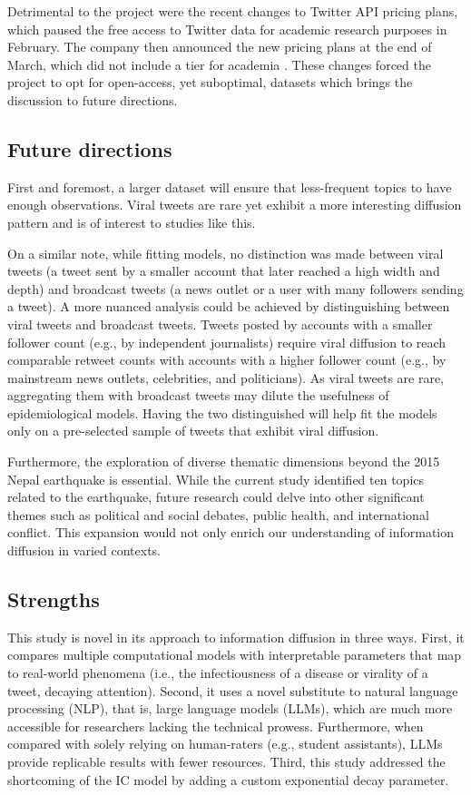 \documentclass[11pt,a4paper]{article}
\begin{document}
    Detrimental to the project were the recent changes to Twitter API pricing plans,  which paused the free access to Twitter data \cite{center_for_an_informed_public_at_university_of_washington_twitters_2023} for academic research purposes in February. The company then announced the new pricing plans at the end of March, which did not include a tier for academia \cite{developers_xdevelopers_today_2023}. These changes forced the project to opt for open-access, yet suboptimal, datasets which brings the discussion to future directions.
    
    \subsection{Future directions}
    First and foremost, a larger dataset will ensure that less-frequent topics to have enough observations. Viral tweets are rare \cite{goel_structural_2016, goel_note_2015} yet exhibit a more interesting diffusion pattern and is of interest to studies like this.

    On a similar note, while fitting models, no distinction was made between viral tweets (a tweet sent by a smaller account that later reached a high width and depth) and broadcast tweets (a news outlet or a user with many followers sending a tweet). A more nuanced analysis could be achieved by distinguishing between viral tweets and broadcast tweets. Tweets posted by accounts with a smaller follower count (e.g., by independent journalists) require viral diffusion to reach comparable retweet counts with accounts with a higher follower count (e.g., by mainstream news outlets, celebrities, and politicians). As viral tweets are rare, aggregating them with broadcast tweets may dilute the usefulness of epidemiological models. Having the two distinguished will help fit the models only on a pre-selected sample of tweets that exhibit viral diffusion. 

    Furthermore, the exploration of diverse thematic dimensions beyond the 2015 Nepal earthquake is essential. While the current study identified ten topics related to the earthquake, future research could delve into other significant themes such as political and social debates, public health, and international conflict. This expansion would not only enrich our understanding of information diffusion in varied contexts.
    
    \subsection{Strengths}
    This study is novel in its approach to information diffusion in three ways. First, it compares multiple computational models with interpretable parameters that map to real-world phenomena (i.e., the infectiousness of a disease or virality of a tweet, decaying attention). Second, it uses a novel substitute to natural language processing (NLP), that is, large language models (LLMs), which are much more accessible for researchers lacking the technical prowess. Furthermore, when compared with solely relying on human-raters (e.g., student assistants), LLMs provide replicable results with fewer resources. Third, this study addressed the shortcoming of the IC model by adding a custom exponential decay parameter.
\end{document}
